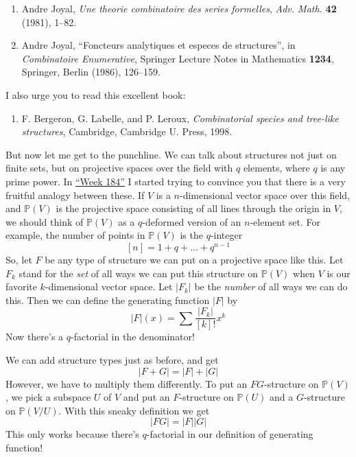 \documentclass{article}
\def\tightlist{}
\begin{document}
\begin{enumerate}
\def\labelenumi{\arabic{enumi})}
\setcounter{enumi}{6}
\item
  Andre Joyal, \emph{Une theorie combinatoire des series formelles},
  \emph{Adv. Math.} \textbf{42} (1981), 1--82.
\item
  Andre Joyal, ``Foncteurs analytiques et especes de structures'', in
  \emph{Combinatoire Enumerative}, Springer Lecture Notes in Mathematics
  \textbf{1234}, Springer, Berlin (1986), 126--159.
\end{enumerate}

I also urge you to read this excellent book:

\begin{enumerate}
\def\labelenumi{\arabic{enumi})}
\setcounter{enumi}{8}
\tightlist
\item
  F. Bergeron, G. Labelle, and P. Leroux, \emph{Combinatorial species
  and tree-like structures}, Cambridge, Cambridge U. Press, 1998.
\end{enumerate}

But now let me get to the punchline. We can talk about structures not
just on finite sets, but on projective spaces over the field with \(q\)
elements, where \(q\) is any prime power. In
\protect\hyperlink{week184}{``Week 184''} I started trying to convince
you that there is a very fruitful analogy between these. If \(V\) is a
\(n\)-dimensional vector space over this field, and \(\mathbb{P}(V)\) is
the projective space consisting of all lines through the origin in
\(V\), we should think of \(\mathbb{P}(V)\) as a \(q\)-deformed version
of an \(n\)-element set. For example, the number of points in
\(\mathbb{P}(V)\) is the \(q\)-integer
\[[n] = 1 + q + \ldots + q^{n-1}\] So, let \(F\) be any type of
structure we can put on a projective space like this. Let \(F_k\) stand
for the \emph{set} of all ways we can put this structure on
\(\mathbb{P}(V)\) when \(V\) is our favorite \(k\)-dimensional vector
space. Let \(|F_k|\) be the \emph{number} of all ways we can do this.
Then we can define the generating function \(|F|\) by
\[|F|(x) = \sum\frac{|F_k|}{[k]!}x^k\] Now there's a \(q\)-factorial in
the denominator!

We can add structure types just as before, and get \[|F+G| = |F| + |G|\]
However, we have to multiply them differently. To put an
\(FG\)-structure on \(\mathbb{P}(V)\), we pick a subspace \(U\) of \(V\)
and put an \(F\)-structure on \(\mathbb{P}(U)\) and a \(G\)-structure on
\(\mathbb{P}(V/U)\). With this sneaky definition we get
\[|FG| = |F| |G|\] This only works because there's \(q\)-factorial in
our definition of generating function!
\end{document}

